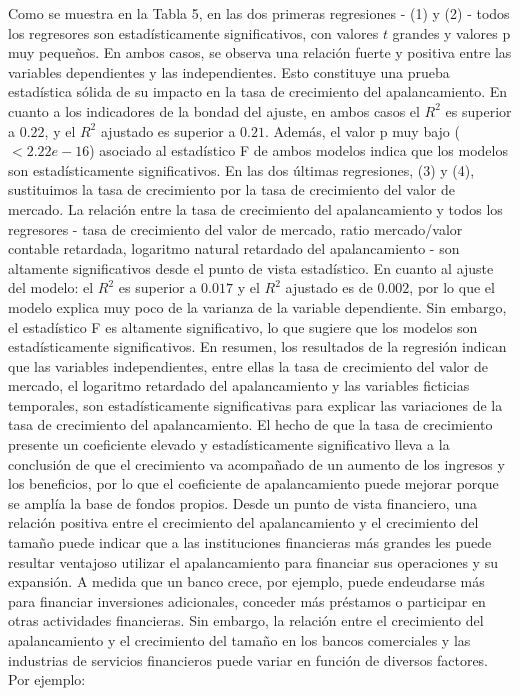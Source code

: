 \documentclass[a4paper,fleqn]{cas-sc}
\begin{document}
Como se muestra en la Tabla 5, en las dos primeras regresiones - (1) y (2) - todos los regresores son estadísticamente significativos, con valores $t$ grandes y valores p muy pequeños. En ambos casos, se observa una relación fuerte y positiva entre las variables dependientes y las independientes. Esto constituye una prueba estadística sólida de su impacto en la tasa de crecimiento del apalancamiento. En cuanto a los indicadores de la bondad del ajuste, en ambos casos el $R^2$ es superior a $0.22$, y el $R^2$ ajustado es superior a $0.21$. Además, el valor p muy bajo ($<2.22e-16$) asociado al estadístico F de ambos modelos indica que los modelos son estadísticamente significativos.
En las dos últimas regresiones, (3) y (4), sustituimos la tasa de crecimiento por la tasa de crecimiento del valor de mercado. La relación entre la tasa de crecimiento del apalancamiento y todos los regresores - tasa de crecimiento del valor de mercado, ratio mercado/valor contable retardada, logaritmo natural retardado del apalancamiento - son altamente significativos desde el punto de vista estadístico. En cuanto al ajuste del modelo: el $R^2$ es superior a $0.017$ y el $R^2$ ajustado es de $0.002$, por lo que el modelo explica muy poco de la varianza de la variable dependiente. Sin embargo, el estadístico F es altamente significativo, lo que sugiere que los modelos son estadísticamente significativos.
En resumen, los resultados de la regresión indican que las variables independientes, entre ellas la tasa de crecimiento del valor de mercado, el logaritmo retardado del apalancamiento y las variables ficticias temporales, son estadísticamente significativas para explicar las variaciones de la tasa de crecimiento del apalancamiento. El hecho de que la tasa de crecimiento presente un coeficiente elevado y estadísticamente significativo lleva a la conclusión de que el crecimiento va acompañado de un aumento de los ingresos y los beneficios, por lo que el coeficiente de apalancamiento puede mejorar porque se amplía la base de fondos propios.
Desde un punto de vista financiero, una relación positiva entre el crecimiento del apalancamiento y el crecimiento del tamaño puede indicar que a las instituciones financieras más grandes les puede resultar ventajoso utilizar el apalancamiento para financiar sus operaciones y su expansión. A medida que un banco crece, por ejemplo, puede endeudarse más para financiar inversiones adicionales, conceder más préstamos o participar en otras actividades financieras. Sin embargo, la relación entre el crecimiento del apalancamiento y el crecimiento del tamaño en los bancos comerciales y las industrias de servicios financieros puede variar en función de diversos factores. Por ejemplo:
\end{document}
